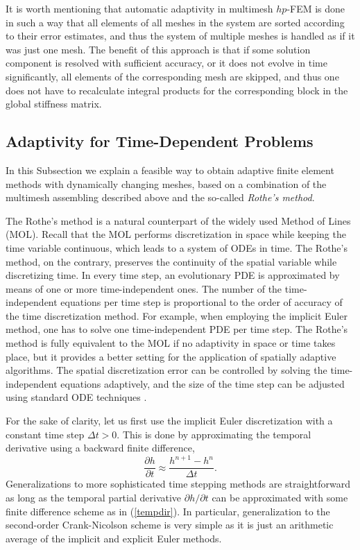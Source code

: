 \documentclass[final,3p,times,twocolumn]{elsarticle}
\begin{document}
It is worth mentioning that automatic adaptivity in multimesh 
$hp$-FEM is done in such a way that all elements of all meshes 
in the system are sorted according to their error estimates, 
and thus the system of multiple meshes is handled as if it was
just one mesh. The benefit of this approach is that if some
solution component is resolved with sufficient accuracy, or it 
does not evolve in time significantly, all elements of the 
corresponding mesh are skipped, and thus one does not have to 
recalculate integral products for the corresponding block in 
the global stiffness matrix. 

\subsection{Adaptivity for Time-Dependent Problems}

In this Subsection we explain a feasible way to obtain 
adaptive finite element methods with dynamically changing meshes,
based on a combination of the multimesh assembling described
above and the so-called {\em Rothe's method}.

The Rothe's method is a natural counterpart of the widely used Method of Lines (MOL). 
Recall that the MOL performs discretization in space while 
keeping the time variable continuous, which leads to a system of ODEs in time. The Rothe's 
method, on the contrary, preserves the continuity of the spatial variable while discretizing time. 
In every time step, an evolutionary PDE is approximated by means of one or more time-independent ones. 
The number of the time-independent equations per time step is proportional to the order of accuracy of the 
time discretization method. For example, when employing the implicit Euler method, one 
has to solve one time-independent PDE per time step. The Rothe's method is fully equivalent to the 
MOL if no adaptivity in space or time takes place, but it provides a better setting 
for the application of spatially adaptive algorithms. The spatial discretization error
can be controlled by solving the time-independent equations adaptively, and the size of 
the time step can be adjusted using standard ODE techniques \cite{hairer}. 

For the sake of clarity, let us first use the 
implicit Euler discretization with a constant time step $\Delta t > 0$.
This is done by approximating the temporal derivative using a backward finite 
difference,
\begin{equation}\label{tempdir}
\frac{\partial h}{\partial t} \approx \frac{h^{n+1} - h^n}{\Delta t}.
\end{equation}
Generalizations to more sophisticated time stepping methods are straightforward
as long as the temporal partial derivative $\partial h / \partial t$ can be approximated
with some finite difference scheme as in (\ref{tempdir}). In particular, 
generalization to the second-order Crank-Nicolson scheme is very simple 
as it is just an arithmetic average of the implicit and explicit Euler methods.  
\end{document}
